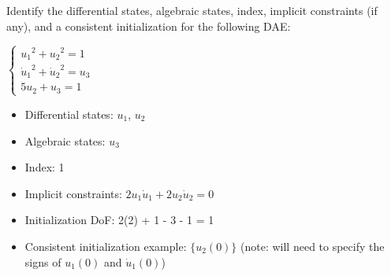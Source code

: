 \begin{exercise}
Identify the differential states, algebraic states, index, implicit constraints (if any), and a consistent initialization for the following DAE:

$\displaystyle \begin{cases}
    {u_1}^2 + {u_2}^2 = 1 \\
    {\dot{u}_1}^2 + {\dot{u}_2}^2 = u_3 \\
    5 u_2 + u_3 = 1
    \end{cases}$
\end{exercise}
\begin{solution}
\begin{itemize}
    \item Differential states: $u_1$, $u_2$
    \item Algebraic states: $u_3$
    \item Index: 1
    \item Implicit constraints: $2 u_1 \dot u_1 + 2 u_2 \dot u_2 = 0$
    \item Initialization DoF: 2(2) + 1 - 3 - 1 = 1
    \item Consistent initialization example: $\{u_2(0)\}$ (note: will need to specify the signs of $u_1(0)$ and $\dot u_1(0)$)
\end{itemize}
\end{solution}

